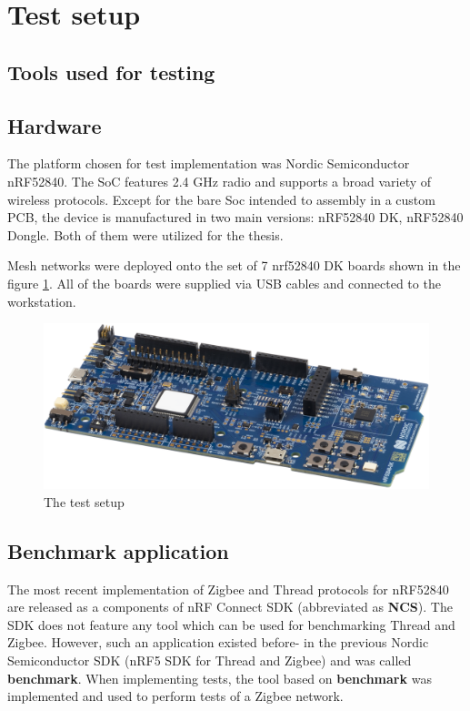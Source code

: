 \section{Test setup}

\subsection{Tools used for testing}

\subsection*{Hardware}
 The platform chosen for test implementation was Nordic Semiconductor nRF52840. The SoC features 2.4 GHz 
 radio and supports a broad variety of wireless protocols. Except for the bare Soc intended to assembly in a 
 custom PCB, the device is manufactured in two main versions: nRF52840 DK, nRF52840 Dongle. Both of them were 
 utilized for the thesis.
 
 Mesh networks were deployed onto the set of 7 nrf52840 DK boards shown in the figure \ref{fig:test_boards}. All of the boards were supplied via USB cables and connected to the workstation.

\begin{figure}[H]
    \centering
    \includegraphics[scale=0.3]{images/test_boards.png}
    \caption{The test setup}
    \label{fig:test_boards}
\end{figure}

\subsection*{Benchmark application}

The most recent implementation of Zigbee and Thread protocols for nRF52840 are released as a components of nRF  
Connect  SDK (abbreviated as \textbf{NCS}). The SDK does not feature any tool which can be used for 
benchmarking Thread and Zigbee. However, such an application existed before- in the previous Nordic Semiconductor SDK (nRF5 SDK for Thread and Zigbee) and was called \textbf{benchmark}. When implementing tests, 
the tool based on 
\textbf{benchmark} was implemented and used to perform tests of a Zigbee network.

